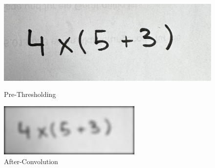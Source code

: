 \documentclass[@CLASSOPTIONS@]{tumarticle}
\begin{document}
\begin{figure}[!htb]
    \vspace{0.3cm}
   \begin{minipage}{0.48\textwidth}
     \centering
     \includegraphics[width=.7\linewidth]{figures/real_data_1}
     \caption{Pre-Thresholding}\label{Fig:Data3}
   \end{minipage}\hfill
   \vspace{0.3cm}
   \begin{minipage}{0.48\textwidth}
     \centering
     \includegraphics[width=.7\linewidth]{figures/convolve}
     \caption{After-Convolution}\label{Fig:Data4_1}
   \end{minipage}
      \vspace{0.3cm}


\end{figure}
\end{document}
